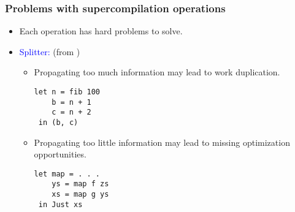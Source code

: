 \documentclass{beamer}
\begin{document}
\begin{frame}[fragile]
    \frametitle{Problems with supercompilation operations}

    \begin{itemize}[<+->]
        \item[]
            Each operation has hard problems to solve.

        \item[]
            \textcolor{blue}{Splitter:}
            (from \citet{callbyneed-sc})
            \begin{itemize}
                \item[]
                    Propagating too much information may lead to work
                    duplication.

                    \begin{verbatim}
let n = fib 100
    b = n + 1
    c = n + 2
 in (b, c)
                    \end{verbatim}

                \item[]
                    Propagating too little information may lead to missing
                    optimization opportunities.
                    \begin{verbatim}
let map = . . .
    ys = map f zs
    xs = map g ys
 in Just xs
                    \end{verbatim}
            \end{itemize}
    \end{itemize}
\end{frame}
\end{document}
